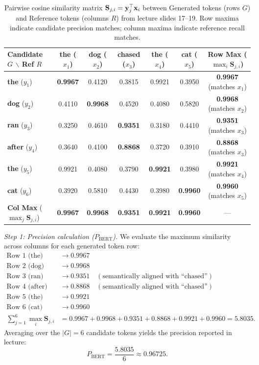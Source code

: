 \documentclass[../../../main.tex]{subfiles}
\begin{document}
\begin{table}[htbp]
\centering
\small
\caption{Pairwise cosine similarity matrix $\mathbf{S}_{j, i} = \mathbf{y}_j^\top \mathbf{x}_i$ between Generated tokens (rows $G$) and Reference tokens (columns $R$) from lecture slides 17--19. Row maxima indicate candidate precision matches; column maxima indicate reference recall matches.}
\label{tab:bertscore_matrix_lecture}
\begin{tabular}{lccccc|c}
\toprule
\textbf{Candidate $G$ $\backslash$ Ref $R$} & \textbf{the} ($x_1$) & \textbf{dog} ($x_2$) & \textbf{chased} ($x_3$) & \textbf{the} ($x_4$) & \textbf{cat} ($x_5$) & \textbf{Row Max} ($\max_i \mathbf{S}_{j,i}$) \\
\midrule
\textbf{the} ($y_1$)   & \textbf{0.9967} & 0.4120 & 0.3815 & 0.9921 & 0.3950 & \textbf{0.9967} (matches $x_1$) \\
\textbf{dog} ($y_2$)   & 0.4110 & \textbf{0.9968} & 0.4520 & 0.4080 & 0.5820 & \textbf{0.9968} (matches $x_2$) \\
\textbf{ran} ($y_3$)   & 0.3250 & 0.4610 & \textbf{0.9351} & 0.3180 & 0.4410 & \textbf{0.9351} (matches $x_3$) \\
\textbf{after} ($y_4$) & 0.3640 & 0.4100 & \textbf{0.8868} & 0.3720 & 0.3910 & \textbf{0.8868} (matches $x_3$) \\
\textbf{the} ($y_5$)   & 0.9921 & 0.4080 & 0.3790 & \textbf{0.9921} & 0.3980 & \textbf{0.9921} (matches $x_4$) \\
\textbf{cat} ($y_6$)   & 0.3920 & 0.5810 & 0.4430 & 0.3980 & \textbf{0.9960} & \textbf{0.9960} (matches $x_5$) \\
\midrule
\textbf{Col Max} ($\max_j \mathbf{S}_{j,i}$) & \textbf{0.9967} & \textbf{0.9968} & \textbf{0.9351} & \textbf{0.9921} & \textbf{0.9960} & --- \\
\bottomrule
\end{tabular}
\end{table}

\textit{Step 1: Precision calculation ($P_{\text{BERT}}$).}
We evaluate the maximum similarity across columns for each generated token row:
\begin{align}
\text{Row 1 (the)}   &\to 0.9967 \nonumber \\
\text{Row 2 (dog)}   &\to 0.9968 \nonumber \\
\text{Row 3 (ran)}   &\to 0.9351 \quad (\text{semantically aligned with ``chased''}) \nonumber \\
\text{Row 4 (after)} &\to 0.8868 \quad (\text{semantically aligned with ``chased''}) \nonumber \\
\text{Row 5 (the)}   &\to 0.9921 \nonumber \\
\text{Row 6 (cat)}   &\to 0.9960 \nonumber \\
\sum_{j=1}^6 \max_i \mathbf{S}_{j, i} &= 0.9967 + 0.9968 + 0.9351 + 0.8868 + 0.9921 + 0.9960 = 5.8035.
\end{align}
Averaging over the $|G| = 6$ candidate tokens yields the precision reported in lecture:
\begin{equation}
P_{\text{BERT}} = \frac{5.8035}{6} \approx \mathbf{0.96725}.
\end{equation}
\end{document}
